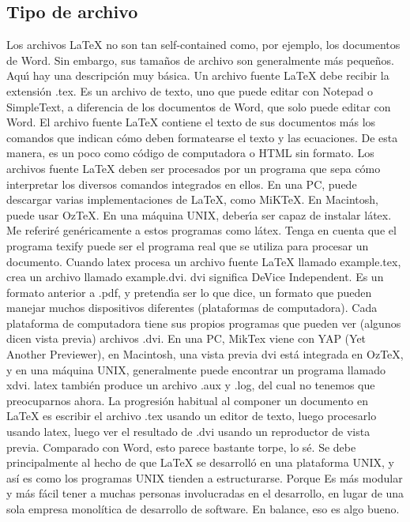 \documentclass[letterpaper, 10pt, journal]{IEEEtran}
\begin{document}
\subsection{Tipo de archivo}
Los archivos LaTeX no son tan self-contained como, por ejemplo, los documentos de Word. Sin embargo, sus tama\~{n}os de archivo son generalmente m\'{a}s peque\~{n}os. Aqu\'{\i} hay una descripci\'{o}n muy b\'{a}sica.
\newline
Un archivo fuente LaTeX debe recibir la extensi\'{o}n .tex. Es un archivo de texto, uno que puede editar con Notepad o SimpleText, a diferencia de los documentos de Word, que solo puede editar con Word. El archivo fuente LaTeX contiene el texto de sus documentos m\'{a}s los comandos que indican c\'{o}mo deben formatearse el texto y las ecuaciones. De esta manera, es un poco como c\'{o}digo de computadora o HTML sin formato.
\newline
Los archivos fuente LaTeX deben ser procesados por un programa que sepa c\'{o}mo interpretar los diversos comandos integrados en ellos. En una PC, puede descargar varias implementaciones de LaTeX, como MiKTeX. En Macintosh, puede usar OzTeX. En una m\'{a}quina UNIX, deber\'{\i}a ser capaz de instalar l\'{a}tex. Me referir\'{e} gen\'{e}ricamente a estos programas como l\'{a}tex. Tenga en cuenta que el programa texify puede ser el programa real que se utiliza para procesar un documento.
\newline
Cuando latex procesa un archivo fuente LaTeX llamado example.tex, crea un archivo llamado example.dvi. dvi significa DeVice Independent. Es un formato anterior a .pdf, y pretend\'{\i}a ser lo que dice, un formato que pueden manejar muchos dispositivos diferentes (plataformas de computadora). Cada plataforma de computadora tiene sus propios programas que pueden ver (algunos dicen vista previa) archivos .dvi. En una PC, MikTex viene con YAP (Yet Another Previewer), en Macintosh, una vista previa dvi est\'{a} integrada en OzTeX, y en una m\'{a}quina UNIX, generalmente puede encontrar un programa llamado xdvi. latex tambi\'{e}n produce un archivo .aux y .log, del cual no tenemos que preocuparnos ahora.
\newline
La progresi\'on habitual al componer un documento en LaTeX es escribir el archivo .tex usando un editor de texto, luego procesarlo usando latex, luego ver el resultado de .dvi usando un reproductor de vista previa. Comparado con Word, esto parece bastante torpe, lo s\'e. Se debe principalmente al hecho de que LaTeX se desarroll\'o en una plataforma UNIX, y as\'i es como los programas UNIX tienden a estructurarse. Porque Es m\'as modular y m\'as f\'acil tener a muchas personas involucradas en el desarrollo, en lugar de una sola empresa monol\'itica de desarrollo de software. En balance, eso es algo bueno.
\end{document}
